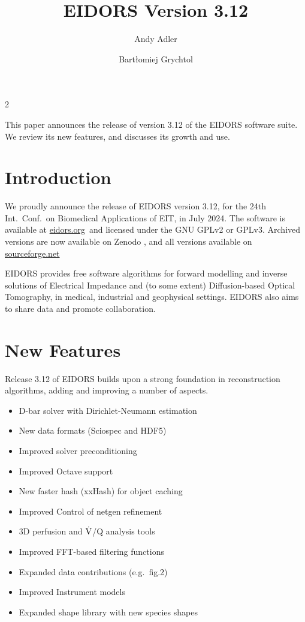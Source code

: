 \documentclass[10pt,a4paper]{article}
\title{EIDORS Version 3.12%
\vspace{-0.5ex}} %
\author[1]{Andy Adler}
\author[1]{Bartłomiej Grychtol}
\affil[1]{Systems and Computer Engineering, Carleton University, Ottawa, Canada, \protect\href{mailto:adler@sce.carleton.ca}{\underline{adler@asce.carleton.ca}}}
\date{}
\begin{document}
\maketitle
\thispagestyle{firstpage}
\vspace{-1.5cm}

\begin{multicols}{2}

This paper announces the release of version 3.12 of the
EIDORS software suite. We review its new features, and 
discusses its growth and use.

\section{Introduction}
We proudly announce the release of EIDORS version 3.12,
for the 24th Int.\ Conf.\ on Biomedical Applications of EIT,
in July 2024.
The software is available at \href{www.eidors.org}{eidors.org}\, and licensed under the GNU GPLv2 or GPLv3. Archived versions are now available on Zenodo
\cite{eidors3p11,
      eidors3p10,
      eidors3p9p1,
      eidors3p9,
      eidors3p8}, and all versions available on 
\href{www.sourceforge.net}{sourceforge.net}
\cite{adler2005, adler2006, adler2008, adler2015, adler2017}


EIDORS provides free software algorithms for forward modelling
and inverse solutions
of Electrical Impedance and (to some extent) Diffusion-based Optical Tomography, in
medical, industrial and geophysical settings.
EIDORS also aims to share data and promote
collaboration.

\section{New Features}
Release 3.12 of EIDORS builds upon a strong foundation in reconstruction
algorithms, adding and improving a number of aspects.
\begin{itemize}
\item D-bar solver with Dirichlet-Neumann estimation
\item New data formats (Sciospec and HDF5)\cite{possner2023hdf5}
\item Improved solver preconditioning
\item Improved Octave support
\item New faster hash (xxHash) for object caching
\item Improved Control of netgen refinement
\item 3D perfusion and $\dot{\rm V}$/Q analysis tools\cite{araos2023VQ}
\item Improved FFT-based filtering functions
\item Expanded data contributions (e.g.~fig.2)
\item Improved Instrument models
\item Expanded shape library with new species shapes


\end{itemize}
\end{multicols}
\end{document}
